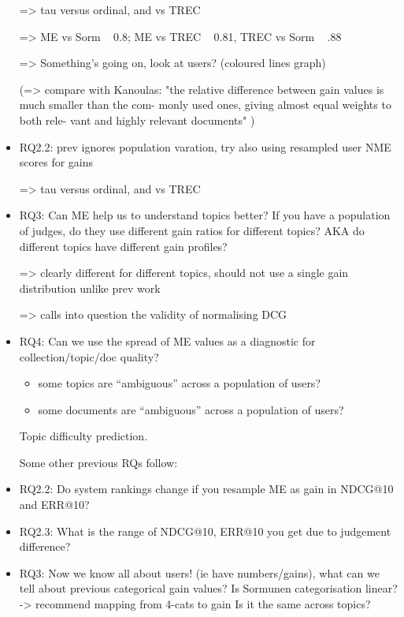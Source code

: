 \begin{itemize}
      => tau versus ordinal, and vs TREC

      => ME vs Sorm ~ 0.8; ME vs TREC ~ 0.81, TREC vs Sorm ~ .88

      => Something's going on, look at users?
      (coloured lines graph)




      (=> compare with Kanoulas: "the relative difference between gain
      values is much smaller than the com- monly used ones, giving
      almost equal weights to both rele- vant and highly relevant
      documents" )

\item RQ2.2: prev ignores population varation, try also using resampled user NME scores for gains
           
      => tau versus ordinal, and vs TREC

\item RQ3: Can ME help us to understand topics better? If you have a population of judges, do they use different gain
      ratios for different topics? AKA do different topics have
      different gain profiles?

      => clearly different for different topics, should not use a single
      gain distribution unlike prev work

      => calls into question the validity of normalising DCG


\item RQ4: Can we use the spread of ME values as a diagnostic for collection/topic/doc quality?
    \begin{itemize}
           \item some topics are ``ambiguous'' across a population of users?
           \item some documents are ``ambiguous'' across a population of users?
    \end{itemize}
    Topic difficulty prediction.



Some other previous RQs follow:

\item RQ2.2: Do system rankings change if you resample ME as gain in NDCG@10 and ERR@10?

\item RQ2.3: What is the range of NDCG@10, ERR@10 you get due to judgement difference?

\item RQ3: Now we know all about users! (ie have numbers/gains), 
           what can we tell about previous categorical gain values?
        Is Sormunen categorisation linear? -> recommend mapping from 4-cats to gain 
              Is it the same across topics?


\end{itemize}

